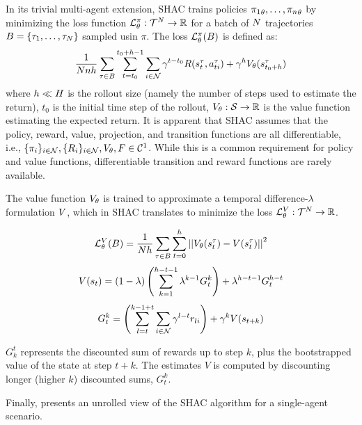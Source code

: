In its trivial multi-agent extension, SHAC trains policies ${\pi_1}_\theta,\dots,{\pi_n}_\theta$ by minimizing the loss function $\mathcal{L}_\theta^{\pi}:\mathcal{T}^N\rightarrow\mathbb{R}$ for a batch of $N$ trajectories $B = \{\tau_1, \ldots, \tau_N\}$ sampled usin $\pi$. The loss $\mathcal{L}_\theta^{\pi}(B)$ is defined as:  
\begin{equation*}\label{eq:shac}
    \frac{1}{Nnh}\sum_{\tau\in B} \sum_{t=t_0}^{t_0+h-1} \sum_{i\in\mathcal{N}} \gamma^{t-t_0} R(s_{t}^\tau, a_{ti}^\tau) + \gamma^h V_\theta(s^\tau_{t_0+h})
\end{equation*}
where $h \ll H$ is the rollout size (namely the number of steps used to estimate the return), $t_0$ is the initial time step of the rollout, $V_\theta: \mathcal{S} \rightarrow \mathbb{R}$ is the value function estimating the expected return. It is apparent that SHAC assumes that the policy, reward, value, projection, and transition functions are all differentiable, i.e., $\{\pi_{i}\}_{i\in\mathcal{N}},\{R_{i}\}_{i\in\mathcal{N}},V_\theta,F \in \mathcal{C}^1$. While this is a common requirement for policy and value functions, differentiable transition and reward functions are rarely available. 

The value function $V_\theta$ is trained to approximate a temporal difference-$\lambda$ formulation \cite{Sutton98} $V$, which in SHAC translates to minimize the loss $\mathcal{L}_\theta^{V}:\mathcal{T}^N\rightarrow\mathbb{R}$.

$$ \mathcal{L}_\theta^V(B)=\frac{1}{Nh}\sum_{\tau\in B}\sum_{t=0}^h\left|\left| V_\theta(s^\tau_t) - V(s^\tau_t) \right|\right|^2 $$
$$ V(s_t) = (1-\lambda) \left(\sum_{k=1}^{h-t-1}\lambda^{k-1}G_t^k\right) + \lambda^{h-t-1}G_t^{h-t}$$
$$ G_t^k = \left(\sum_{l=t}^{k-1+t}\sum_{i\in\mathcal{N}}\gamma^{l-t} r_{li}\right) + \gamma^k V(s_{t+k})$$

$G^t_k$ represents the discounted sum of rewards up to step $k$, plus the bootstrapped value of the state at step $t+k$. The estimates $V$ is computed by discounting longer (higher $k$) discounted sums, $G^k_t$.

Finally,  presents an unrolled view of the SHAC algorithm for a single-agent scenario.
